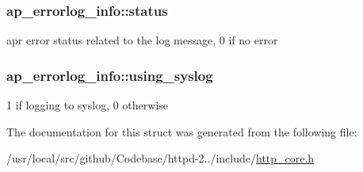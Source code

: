 \subsubsection[{\texorpdfstring{status}{status}}]{ ap\+\_\+errorlog\+\_\+info\+::status}\hypertarget{structap__errorlog__info_a31d64478cfeb2fd0929cf95343c8f8a8}{}\label{structap__errorlog__info_a31d64478cfeb2fd0929cf95343c8f8a8}
apr error status related to the log message, 0 if no error 
\subsubsection[{\texorpdfstring{using\+\_\+syslog}{using_syslog}}]{ ap\+\_\+errorlog\+\_\+info\+::using\+\_\+syslog}\hypertarget{structap__errorlog__info_a7678270ad40b9c1d58b0fc32737bec58}{}\label{structap__errorlog__info_a7678270ad40b9c1d58b0fc32737bec58}
1 if logging to syslog, 0 otherwise 

The documentation for this struct was generated from the following file\+:\begin{DoxyCompactItemize}
\item 
/usr/local/src/github/\+Codebase/httpd-\/2../include/\hyperlink{http__core_8h}{http\+\_\+core.\+h}\end{DoxyCompactItemize}
